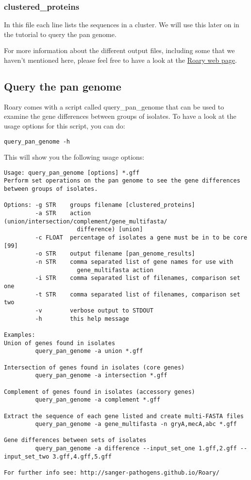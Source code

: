 \documentclass[11pt]{article}
\begin{document}
\hypertarget{clustered_proteins}{%
\subsubsection{clustered\_proteins}\label{clustered_proteins}}

In this file each line lists the sequences in a cluster. We will use
this later on in the tutorial to query the pan genome.

    For more information about the different output files, including some
that we haven't mentioned here, please feel free to have a look at the
\href{https://sanger-pathogens.github.io/Roary/}{Roary web page}.

    \hypertarget{query-the-pan-genome}{%
\subsection{Query the pan genome}\label{query-the-pan-genome}}

Roary comes with a script called query\_pan\_genome that can be used to
examine the gene differences between groups of isolates. To have a look
at the usage options for this script, you can do:

\begin{verbatim}
query_pan_genome -h
\end{verbatim}

This will show you the following usage options:

\begin{verbatim}
Usage: query_pan_genome [options] *.gff
Perform set operations on the pan genome to see the gene differences
between groups of isolates.

Options: -g STR    groups filename [clustered_proteins]
         -a STR    action (union/intersection/complement/gene_multifasta/
                     difference) [union]
         -c FLOAT  percentage of isolates a gene must be in to be core [99]
         -o STR    output filename [pan_genome_results]
         -n STR    comma separated list of gene names for use with
                     gene_multifasta action
         -i STR    comma separated list of filenames, comparison set one
         -t STR    comma separated list of filenames, comparison set two
         -v        verbose output to STDOUT
         -h        this help message

Examples:
Union of genes found in isolates
         query_pan_genome -a union *.gff

Intersection of genes found in isolates (core genes)
         query_pan_genome -a intersection *.gff

Complement of genes found in isolates (accessory genes)
         query_pan_genome -a complement *.gff

Extract the sequence of each gene listed and create multi-FASTA files
         query_pan_genome -a gene_multifasta -n gryA,mecA,abc *.gff

Gene differences between sets of isolates
         query_pan_genome -a difference --input_set_one 1.gff,2.gff --input_set_two 3.gff,4.gff,5.gff

For further info see: http://sanger-pathogens.github.io/Roary/
\end{verbatim}
\end{document}
